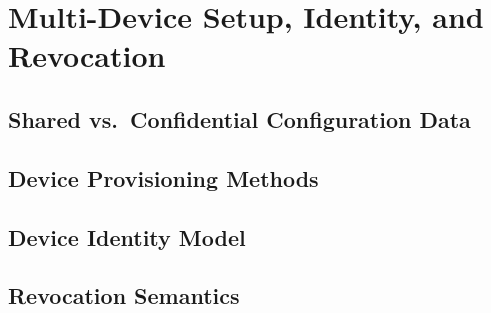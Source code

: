 %

\chapter{Multi-Device Setup, Identity, and Revocation}

\section{Shared vs.\ Confidential Configuration Data}

\section{Device Provisioning Methods}

\section{Device Identity Model}

\section{Revocation Semantics}
